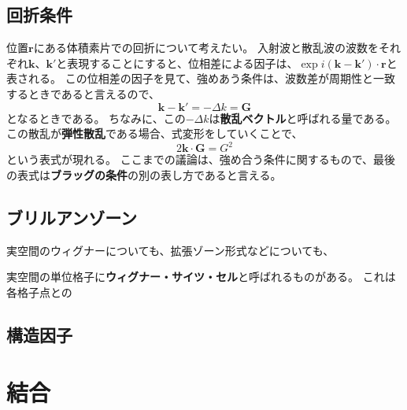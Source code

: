 \documentclass[a4paper]{jsreport}
\begin{document}
        \section{回折条件}
            位置$\boldsymbol{r}$にある体積素片での回折について考えたい。
            入射波と散乱波の波数をそれぞれ$\boldsymbol{k}$、$\boldsymbol{k'}$と表現することにすると、位相差による因子は、$\exp{i(\boldsymbol{k} - \boldsymbol{k'}) \cdot \boldsymbol{r}}$と表される。
            この位相差の因子を見て、強めあう条件は、波数差が周期性と一致するときであると言えるので、
            \begin{equation}
                \boldsymbol{k} - \boldsymbol{k'} = - \Delta k = \boldsymbol{G}
            \end{equation}
            となるときである。
            ちなみに、この$- \Delta k$は\textbf{散乱ベクトル}と呼ばれる量である。
            この散乱が\textbf{弾性散乱}である場合、式変形をしていくことで、
            \begin{equation}
                2 \boldsymbol{k} \cdot \boldsymbol{G} = G^2
            \end{equation}
            という表式が現れる。
            ここまでの議論は、強め合う条件に関するもので、最後の表式は\textbf{ブラッグの条件}の別の表し方であると言える。

        \section{ブリルアンゾーン}
            実空間のウィグナーについても、拡張ゾーン形式などについても、\par
            実空間の単位格子に\textbf{ウィグナー・サイツ・セル}と呼ばれるものがある。
            これは各格子点との

        \section{構造因子}
        
        

    \chapter{結合}
        \section{}
        \section{}
\end{document}
